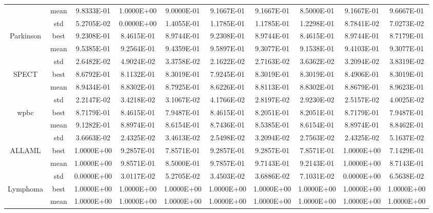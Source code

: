 \documentclass{wzuthesis}
\begin{document}
\begin{table}[htbp]
\begin{tabular}{cccccccccc}
          & mean  & 9.8333E-01 & 1.0000E+00 & 9.0000E-01 & 9.1667E-01 & 9.1667E-01 & 8.5000E-01 & 9.1667E-01 & 9.6667E-01 \\
          & std   & 5.2705E-02 & 0.0000E+00 & 1.4055E-01 & 1.1785E-01 & 1.1785E-01 & 1.2298E-01 & 8.7841E-02 & 7.0273E-02 \\
    \multirow{3}[0]{*}{Parkinson} & best  & 9.2308E-01 & 8.4615E-01 & 8.9744E-01 & 9.2308E-01 & 8.9744E-01 & 8.4615E-01 & 8.9744E-01 & 8.7179E-01 \\
          & mean  & 9.5385E-01 & 9.2564E-01 & 9.4359E-01 & 9.5897E-01 & 9.3077E-01 & 9.1538E-01 & 9.4103E-01 & 9.3077E-01 \\
          & std   & 2.6482E-02 & 4.9024E-02 & 3.3758E-02 & 2.1622E-02 & 2.7163E-02 & 3.6362E-02 & 3.2094E-02 & 3.8319E-02 \\
    \multirow{3}[0]{*}{SPECT} & best  & 8.6792E-01 & 8.1132E-01 & 8.3019E-01 & 7.9245E-01 & 8.3019E-01 & 8.3019E-01 & 8.4906E-01 & 8.3019E-01 \\
          & mean  & 8.9434E-01 & 8.8302E-01 & 8.7925E-01 & 8.6226E-01 & 8.8113E-01 & 8.8302E-01 & 8.8679E-01 & 8.9623E-01 \\
          & std   & 2.2147E-02 & 3.4218E-02 & 3.1067E-02 & 4.1766E-02 & 2.8197E-02 & 2.9230E-02 & 2.5157E-02 & 4.0025E-02 \\
    \multirow{3}[0]{*}{wpbc} & best  & 8.7179E-01 & 8.4615E-01 & 7.9487E-01 & 8.4615E-01 & 8.2051E-01 & 8.2051E-01 & 8.7179E-01 & 7.9487E-01 \\
          & mean  & 9.1282E-01 & 8.8974E-01 & 8.6154E-01 & 8.7436E-01 & 8.5385E-01 & 8.6154E-01 & 8.8974E-01 & 8.8462E-01 \\
          & std   & 3.6663E-02 & 2.4325E-02 & 3.4613E-02 & 2.5498E-02 & 3.2094E-02 & 2.7563E-02 & 2.4325E-02 & 5.1637E-02 \\
    \multirow{3}[0]{*}{ALLAML} & best  & 1.0000E+00 & 9.2857E-01 & 7.8571E-01 & 9.2857E-01 & 9.2857E-01 & 7.8571E-01 & 1.0000E+00 & 7.1429E-01 \\
          & mean  & 1.0000E+00 & 9.8571E-01 & 8.5000E-01 & 9.7857E-01 & 9.7143E-01 & 9.2143E-01 & 1.0000E+00 & 8.7143E-01 \\
          & std   & 0.0000E+00 & 3.0117E-02 & 5.2705E-02 & 3.4503E-02 & 3.6886E-02 & 7.1031E-02 & 0.0000E+00 & 6.5638E-02 \\
    \multirow{3}[0]{*}{Lymphoma} & best  & 1.0000E+00 & 1.0000E+00 & 1.0000E+00 & 1.0000E+00 & 1.0000E+00 & 1.0000E+00 & 1.0000E+00 & 1.0000E+00 \\
          & mean  & 1.0000E+00 & 1.0000E+00 & 1.0000E+00 & 1.0000E+00 & 1.0000E+00 & 1.0000E+00 & 1.0000E+00 & 1.0000E+00 \\

\end{tabular}
\end{table}
\end{document}
